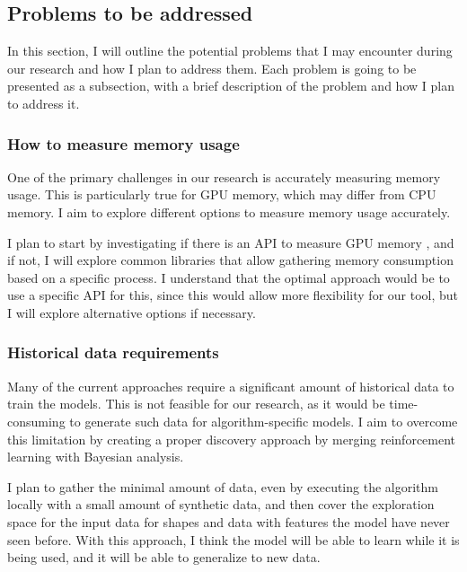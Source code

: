 \subsection{Problems to be addressed}
\label{subsec:problems-to-be-addressed}

In this section, I will outline the potential problems that I may encounter during our research and how I plan to address them.
Each problem is going to be presented as a subsection, with a brief description of the problem and how I plan to address it.

\subsubsection{How to measure memory usage}

One of the primary challenges in our research is accurately measuring memory usage.
This is particularly true for \ac{GPU} memory, which may differ from \ac{CPU} memory.
I aim to explore different options to measure memory usage accurately.

I plan to start by investigating if there is an API to measure \ac{GPU} memory , and if not, I will explore common libraries that allow gathering memory consumption based on a specific process.
I understand that the optimal approach would be to use a specific API for this, since this would allow more flexibility for our tool, but I will explore alternative options if necessary.

\subsubsection{Historical data requirements}

Many of the current approaches require a significant amount of historical data to train the models.
This is not feasible for our research, as it would be time-consuming to generate such data for algorithm-specific models.
I aim to overcome this limitation by creating a proper discovery approach by merging reinforcement learning with Bayesian analysis.

I plan to gather the minimal amount of data, even by executing the algorithm locally with a small amount of synthetic data, and then cover the exploration space for the input data for shapes and data with features the model have never seen before.
With this approach, I think the model will be able to learn while it is being used, and it will be able to generalize to new data.

